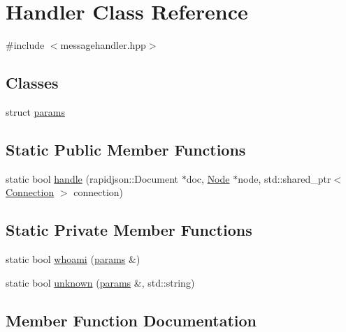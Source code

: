 \hypertarget{classHandler}{}\section{Handler Class Reference}
\label{classHandler}


{\ttfamily \#include $<$messagehandler.\+hpp$>$}

\subsection*{Classes}
\begin{DoxyCompactItemize}
\item 
struct \mbox{\hyperlink{structHandler_1_1params}{params}}
\end{DoxyCompactItemize}
\subsection*{Static Public Member Functions}
\begin{DoxyCompactItemize}
\item 
static bool \mbox{\hyperlink{classHandler_afab4c935cf54ff1bce38c97cc4392b26}{handle}} (rapidjson\+::\+Document $\ast$doc, \mbox{\hyperlink{classNode}{Node}} $\ast$node, std\+::shared\+\_\+ptr$<$ \mbox{\hyperlink{classConnection}{Connection}} $>$ connection)
\end{DoxyCompactItemize}
\subsection*{Static Private Member Functions}
\begin{DoxyCompactItemize}
\item 
static bool \mbox{\hyperlink{classHandler_afe1ccc0e741e068b6d0c667fc421b820}{whoami}} (\mbox{\hyperlink{structHandler_1_1params}{params}} \&)
\item 
static bool \mbox{\hyperlink{classHandler_aff9b9d060534a0a09a63a4d7c1b65407}{unknown}} (\mbox{\hyperlink{structHandler_1_1params}{params}} \&, std\+::string)
\end{DoxyCompactItemize}


\subsection{Member Function Documentation}
\mbox{\label{classHandler_afab4c935cf54ff1bce38c97cc4392b26}} 
